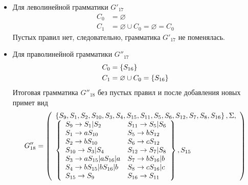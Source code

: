 \begin{itemize}
	\item Для леволинейной грамматики \(G'_{17}\)
	      \begin{align*}
		      C_{0} & = \varnothing                                  \\
		      C_{1} & = \varnothing \cup C_{0} = \varnothing = C_{0}
	      \end{align*}
	      Пустых правил нет, следовательно, грамматика \(G'_{17}\) не поменялась.
	\item Для праволинейной грамматики \(G''_{17}\)
	      \begin{align*}
		      C_{0} & = \left\{S_{16}\right\}                          \\
		      C_{1} & = \varnothing \cup C_{0} = \left\{S_{16}\right\}
	      \end{align*}
	      Итоговая грамматика \(G''_{18}\) без пустых правил и после добавления новых примет вид
	      \begin{align*}
		      G''_{18} = \left( \begin{array}{l} \left\{S_9, S_1, S_2, S_{10}, S_3, S_4, S_{15}, S_{11}, S_5, S_6, S_{12}, S_7, S_8, S_{16}\right\}, \Sigma,\\\left\{\begin{array}{ll} 
		      S_9 \to S_1|S_2           & S_{11} \to S_5|S_6 \\
		      S_1 \to aS_{10}           & S_5 \to bS_{12}    \\
		      S_2 \to bS_{10}           & S_6 \to cS_{12}    \\
		      S_{10} \to S_3|S_4        & S_{12} \to S_7|S_8 \\
		      S_3 \to aS_{15}|aS_{16}|a & S_7 \to bS_{16}|b  \\
		      S_4 \to bS_{15}|bS_{16}|b & S_8 \to cS_{16}|c  \\
		      S_{15} \to S_{9}          & S_{16} \to S_{11}  \\
		       \end{array}\right\}, S_{15} \end{array} \right)
	      \end{align*}
\end{itemize}
